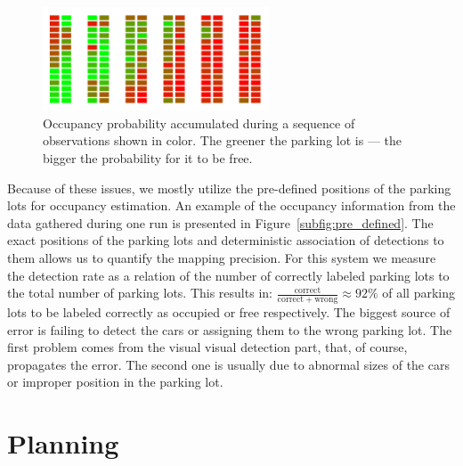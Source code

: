 \begin{figure}[t]
    \begin{center}
        \includegraphics[width=0.6\textwidth]{pictures/parking_lots.png}
    \end{center}
    \caption{Occupancy probability accumulated during a sequence of observations shown in color. The greener the parking lot is --- the bigger the probability for it to be free.}
    \label{fig:occupancy_accumulated}
\end{figure}

Because of these issues, we mostly utilize the pre-defined positions of the
parking lots for occupancy estimation. An example of the occupancy information
from the data gathered during one run is presented in
Figure~\ref{subfig:pre_defined}. The exact positions of the parking lots and
deterministic association of detections to them allows us to quantify the
mapping precision. For this system we measure the detection rate as a relation
of the number of correctly labeled parking lots to the total number of parking
lots. This results in: $\frac{\mathrm{correct}}{\mathrm{correct} +
\mathrm{wrong}} \approx 92\% $ of all parking lots to be labeled correctly as
occupied or free respectively. The biggest source of error is failing to
detect the cars or assigning them to the wrong parking lot. The first problem
comes from the visual visual detection part, that, of course, propagates the
error. The second one is usually due to abnormal sizes of the cars or improper
position in the parking lot.



\section{Planning}
\label{sec:planning_results}

